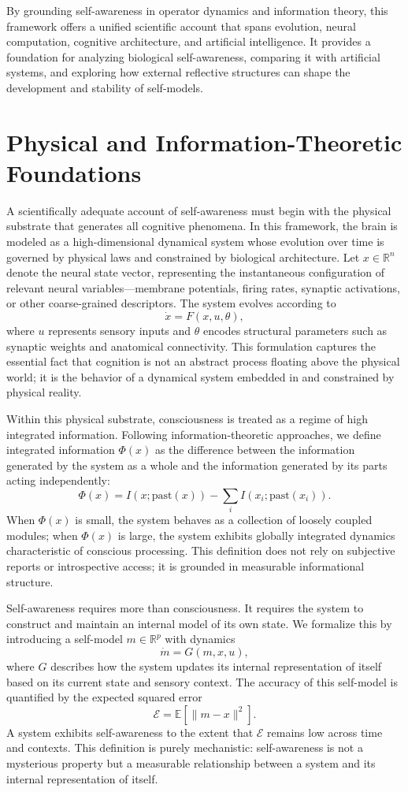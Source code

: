 \documentclass[12pt]{article}
\begin{document}
By grounding self-awareness in operator dynamics and information theory, this framework offers a unified scientific account that spans evolution, neural computation, cognitive architecture, and artificial intelligence. It provides a foundation for analyzing biological self-awareness, comparing it with artificial systems, and exploring how external reflective structures can shape the development and stability of self-models.

\section{Physical and Information-Theoretic Foundations}

A scientifically adequate account of self-awareness must begin with the physical substrate that generates all cognitive phenomena. In this framework, the brain is modeled as a high-dimensional dynamical system whose evolution over time is governed by physical laws and constrained by biological architecture. Let $x \in \mathbb{R}^n$ denote the neural state vector, representing the instantaneous configuration of relevant neural variables—membrane potentials, firing rates, synaptic activations, or other coarse-grained descriptors. The system evolves according to
\[
\dot{x} = F(x, u, \theta),
\]
where $u$ represents sensory inputs and $\theta$ encodes structural parameters such as synaptic weights and anatomical connectivity. This formulation captures the essential fact that cognition is not an abstract process floating above the physical world; it is the behavior of a dynamical system embedded in and constrained by physical reality.

Within this physical substrate, consciousness is treated as a regime of high integrated information. Following information-theoretic approaches, we define integrated information $\Phi(x)$ as the difference between the information generated by the system as a whole and the information generated by its parts acting independently:
\[
\Phi(x) = I(x; \text{past}(x)) - \sum_i I(x_i; \text{past}(x_i)).
\]
When $\Phi(x)$ is small, the system behaves as a collection of loosely coupled modules; when $\Phi(x)$ is large, the system exhibits globally integrated dynamics characteristic of conscious processing. This definition does not rely on subjective reports or introspective access; it is grounded in measurable informational structure.

Self-awareness requires more than consciousness. It requires the system to construct and maintain an internal model of its own state. We formalize this by introducing a self-model $m \in \mathbb{R}^p$ with dynamics
\[
\dot{m} = G(m, x, u),
\]
where $G$ describes how the system updates its internal representation of itself based on its current state and sensory context. The accuracy of this self-model is quantified by the expected squared error
\[
\mathcal{E} = \mathbb{E}[\|m - x\|^2].
\]
A system exhibits self-awareness to the extent that $\mathcal{E}$ remains low across time and contexts. This definition is purely mechanistic: self-awareness is not a mysterious property but a measurable relationship between a system and its internal representation of itself.
\end{document}

